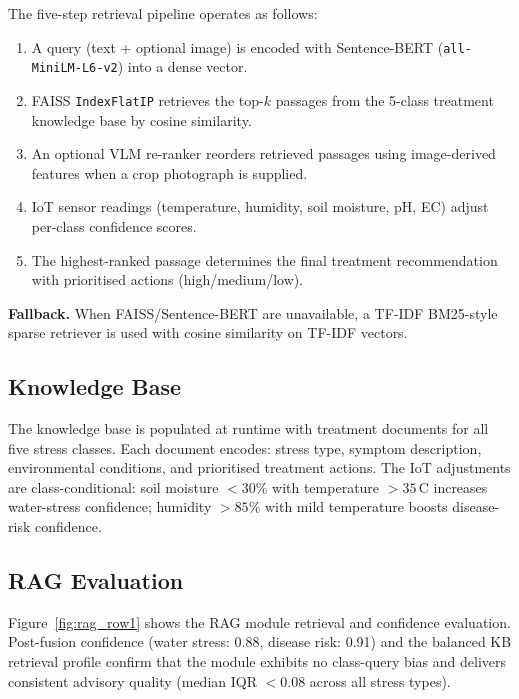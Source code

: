 \documentclass[conference]{IEEEtran}
\begin{document}
The five-step retrieval pipeline operates as follows:
\begin{enumerate}
  \item A query (text + optional image) is encoded with Sentence-BERT
        (\texttt{all-MiniLM-L6-v2}) into a dense vector.
  \item FAISS \texttt{IndexFlatIP} retrieves the top-$k$ passages from the 5-class
        treatment knowledge base by cosine similarity.
  \item An optional VLM re-ranker reorders retrieved passages using image-derived
        features when a crop photograph is supplied.
  \item IoT sensor readings (temperature, humidity, soil moisture, pH, EC) adjust
        per-class confidence scores.
  \item The highest-ranked passage determines the final treatment recommendation with
        prioritised actions (high/medium/low).
\end{enumerate}

\textbf{Fallback.} When FAISS/Sentence-BERT are unavailable, a TF-IDF BM25-style
sparse retriever is used with cosine similarity on TF-IDF vectors.

\subsection{Knowledge Base}

The knowledge base is populated at runtime with treatment documents for all five stress
classes. Each document encodes: stress type, symptom description, environmental
conditions, and prioritised treatment actions. The IoT adjustments are class-conditional:
soil moisture $<30\%$ with temperature $>35$\,\textdegree C increases water-stress
confidence; humidity $>85\%$ with mild temperature boosts disease-risk confidence.

\subsection{RAG Evaluation}

Figure~\ref{fig:rag_row1} shows the RAG module retrieval and confidence evaluation.
Post-fusion confidence (water stress: 0.88, disease risk: 0.91) and the balanced
KB retrieval profile confirm that the module exhibits no class-query bias and delivers
consistent advisory quality (median IQR $<0.08$ across all stress types).
\end{document}
